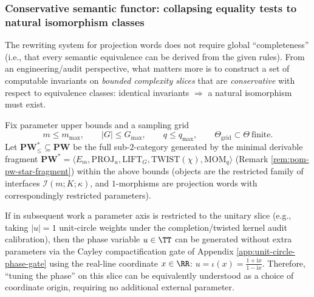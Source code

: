 \subsubsection{Conservative semantic functor: collapsing equality tests to natural isomorphism classes}\label{subsec:pom-semantic-conservative-functor}
The rewriting system for projection words does not require global ``completeness'' (i.e., that every semantic equivalence can be derived from the given rules).
From an engineering/audit perspective, what matters more is to construct a set of computable invariants on \emph{bounded complexity slices} that are \emph{conservative} with respect to equivalence classes: identical invariants \(\Rightarrow\) a natural isomorphism must exist.

\begin{definition}\label{def:pom-bounded-slice}
Fix parameter upper bounds and a sampling grid
\[
m\le m_{\max},\qquad |G|\le G_{\max},\qquad q\le q_{\max},\qquad \Theta_{\mathrm{grid}}\subset\Theta\ \text{finite}.
\]
Let \(\mathbf{PW}^{\ast}_{\le}\subseteq\mathbf{PW}\) be the full sub-\(2\)-category generated by the minimal derivable fragment
\(\mathbf{PW}^{\ast}=\langle E_m,\mathrm{PROJ}_u,\mathrm{LIFT}_G,\mathrm{TWIST}(\chi),\mathrm{MOM}_q\rangle\)
(Remark \ref{rem:pom-pw-star-fragment}) within the above bounds (objects are the restricted family of interfaces \(\mathcal{I}(m;K;\kappa)\), and \(1\)-morphisms are projection words with correspondingly restricted parameters).
\end{definition}

\begin{remark}\label{rem:pom-unitary-slice-param-by-real-line}
If in subsequent work a parameter axis is restricted to the unitary slice (e.g., taking \(|u|=1\) unit-circle weights under the completion/twisted kernel audit calibration), then the phase variable \(u\in\TT\) can be generated without extra parameters via the Cayley compactification gate of Appendix \ref{app:unit-circle-phase-gate} using the real-line coordinate \(x\in\RR\):
\(
u=\iota(x)=\frac{1+\mathrm{i}x}{1-\mathrm{i}x}
\).
Therefore, ``tuning the phase'' on this slice can be equivalently understood as a choice of coordinate origin, requiring no additional external parameter.
\end{remark}

